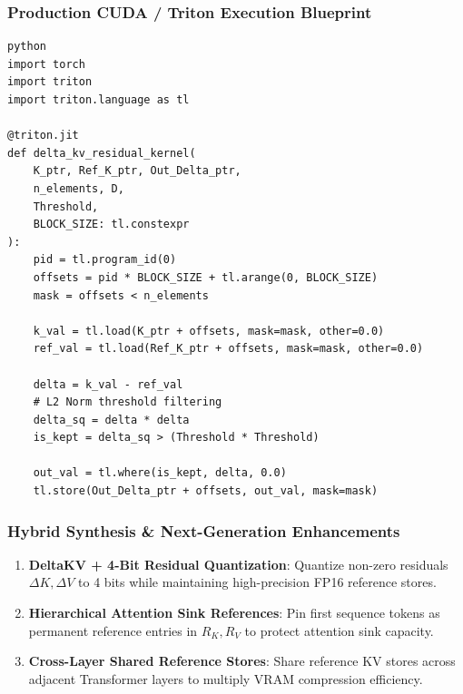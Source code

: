 \subsubsection*{Production CUDA / Triton Execution Blueprint}

\vspace{0.5em}
\begin{mdframed}[backgroundcolor=codebg, linecolor=codeframe, linewidth=1pt, roundcorner=4pt, innerleftmargin=2pt, innerrightmargin=5pt, innertopmargin=5pt, innerbottommargin=5pt]
\begin{lstlisting}
python
import torch
import triton
import triton.language as tl

@triton.jit
def delta_kv_residual_kernel(
    K_ptr, Ref_K_ptr, Out_Delta_ptr,
    n_elements, D,
    Threshold,
    BLOCK_SIZE: tl.constexpr
):
    pid = tl.program_id(0)
    offsets = pid * BLOCK_SIZE + tl.arange(0, BLOCK_SIZE)
    mask = offsets < n_elements

    k_val = tl.load(K_ptr + offsets, mask=mask, other=0.0)
    ref_val = tl.load(Ref_K_ptr + offsets, mask=mask, other=0.0)

    delta = k_val - ref_val
    # L2 Norm threshold filtering
    delta_sq = delta * delta
    is_kept = delta_sq > (Threshold * Threshold)

    out_val = tl.where(is_kept, delta, 0.0)
    tl.store(Out_Delta_ptr + offsets, out_val, mask=mask)
\end{lstlisting}
\end{mdframed}
\vspace{0.5em}


\subsubsection*{Hybrid Synthesis \& Next-Generation Enhancements}

\begin{enumerate}
\item \textbf{DeltaKV + 4-Bit Residual Quantization}: Quantize non-zero residuals $\Delta K, \Delta V$ to 4 bits while maintaining high-precision FP16 reference stores.
\item \textbf{Hierarchical Attention Sink References}: Pin first sequence tokens as permanent reference entries in $R_K, R_V$ to protect attention sink capacity.
\item \textbf{Cross-Layer Shared Reference Stores}: Share reference KV stores across adjacent Transformer layers to multiply VRAM compression efficiency.

\end{enumerate}
